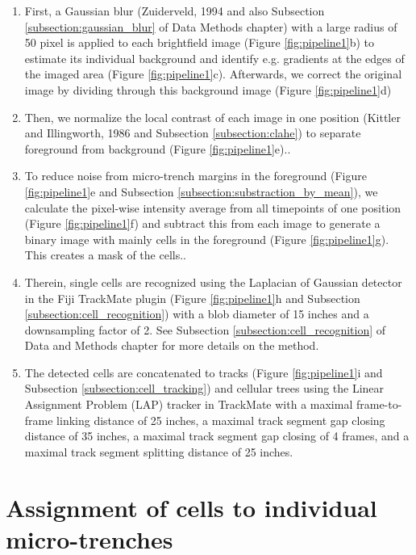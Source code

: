 \documentclass[pdftex,12pt,a4paper]{report}
\begin{document}
\begin{enumerate}
\item First, a Gaussian blur (Zuiderveld, 1994 \cite{zuiderveld1994contrast} and also Subsection \ref{subsection:gaussian_blur} of Data Methods chapter) with a large radius of 50 pixel is applied to each brightfield image (Figure \ref{fig:pipeline1}b) to estimate its individual background and identify e.g. gradients at the edges of the imaged area (Figure \ref{fig:pipeline1}c). Afterwards, we correct the original image by dividing through this background image (Figure \ref{fig:pipeline1}d)

\item Then, we normalize the local contrast of each image in one position (Kittler and Illingworth, 1986 \cite{kittler1986minimum} and Subsection \ref{subsection:clahe}) to separate foreground from background (Figure \ref{fig:pipeline1}e)..

\item To reduce noise from micro-trench margins in the foreground (Figure \ref{fig:pipeline1}e and Subsection \ref{subsection:substraction_by_mean}), we calculate the pixel-wise intensity average from all timepoints of one position (Figure \ref{fig:pipeline1}f) and subtract this from each image to generate a binary image with mainly cells in the foreground (Figure \ref{fig:pipeline1}g). This creates a mask of the cells..

\item Therein, single cells are recognized using the Laplacian of Gaussian detector in the Fiji TrackMate plugin \cite{tinevez2017trackmate} (Figure \ref{fig:pipeline1}h and Subsection \ref{subsection:cell_recognition}) with a blob diameter of 15 inches and a downsampling factor of 2. See Subsection \ref{subsection:cell_recognition} of Data and Methods chapter for more details on the method.

\item The detected cells are concatenated to tracks (Figure \ref{fig:pipeline1}i and Subsection \ref{subsection:cell_tracking}) and cellular trees using the Linear Assignment Problem (LAP) tracker\cite{jaqaman2008robust} in TrackMate with a maximal frame-to-frame linking distance of 25 inches, a maximal track segment gap closing distance of 35 inches, a maximal track segment gap closing of 4 frames, and a maximal track segment splitting distance of 25 inches.
\end{enumerate}

\section{Assignment of cells to individual micro-trenches}
\end{document}

